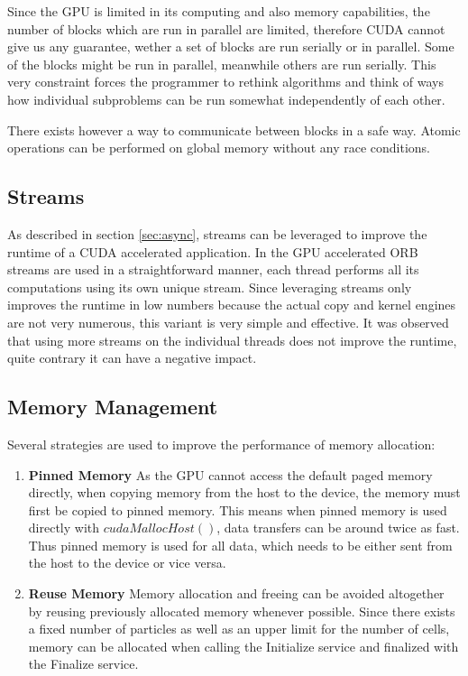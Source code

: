 \documentclass[]{article}
\begin{document}
Since the GPU is limited in its computing and also memory capabilities, the number of blocks which are run in parallel are limited, therefore CUDA cannot give us any guarantee, wether a set of blocks are run serially or in parallel. Some of the blocks might be run in parallel, meanwhile others are run serially. This very constraint forces the programmer to rethink algorithms and think of ways how individual subproblems can be run somewhat independently of each other. 

There exists however a way to communicate between blocks in a safe way. Atomic operations can be performed on global memory without any race conditions.

\subsection{Streams}

As described in section \ref{sec:async}, streams can be leveraged to improve the runtime of a CUDA accelerated application. In the GPU accelerated ORB streams are used in a straightforward manner, each thread performs all its computations using its own unique stream. Since leveraging streams only improves the runtime in low numbers because the actual copy and kernel engines are not very numerous, this variant is very simple and effective. It was observed that using more streams on the individual threads does not improve the runtime, quite contrary it can have a negative impact. 


\subsection{Memory Management}

Several strategies are used to improve the performance of memory allocation: 

\begin{enumerate}
	\item \textbf{Pinned Memory} As the GPU cannot access the default paged memory directly, when copying memory from the host to the device, the memory must first be copied to pinned memory. This means when pinned memory is used directly with $cudaMallocHost()$, data transfers can be around twice as fast. Thus pinned memory is used for all data, which needs to be either sent from the host to the device or vice versa.
	\item \textbf{Reuse Memory} Memory allocation and freeing can be avoided altogether by reusing previously allocated memory whenever possible. Since there exists a fixed number of particles as well as an upper limit for the number of cells, memory can be allocated when calling the Initialize service and finalized with the Finalize service.
\end{enumerate}
\end{document}
